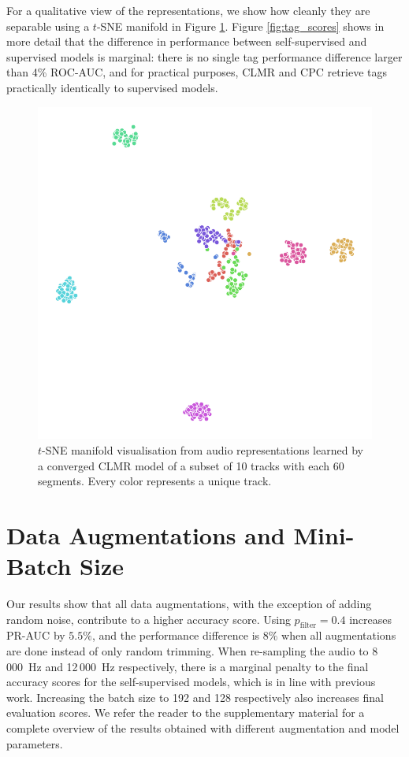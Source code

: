 For a qualitative view of the representations, we show how cleanly they are  separable using a $t$-SNE manifold in Figure \ref{fig:tsne_manifold}. Figure \ref{fig:tag_scores} shows in more detail that the difference in performance between self-supervised and supervised models is marginal: there is no single tag performance difference larger than 4\% ROC-AUC, and for practical purposes, CLMR and CPC retrieve tags practically identically to supervised models.

\begin{figure}[t]
    \centering
    \includegraphics[width=0.75\columnwidth]{figs/tsne-clmr.png}
    \caption{$t$-SNE manifold visualisation from audio representations learned by a converged CLMR model of a subset of 10 tracks with each 60 segments. Every color represents a unique track.}
    \label{fig:tsne_manifold}
\end{figure}



\section{Data Augmentations and Mini-Batch Size}
Our results show that all data augmentations, with the exception of adding random noise, contribute to a higher accuracy score. Using $p_{\mathrm{filter}}=0.4$ increases PR-AUC by $5.5\%$, and the performance difference is $8\%$ when all augmentations are done instead of only random trimming. When re-sampling the audio to 8\,000~Hz and 12\,000~Hz respectively, there is a marginal penalty to the final accuracy scores for the self-supervised models, which is in line with previous work\cite{lee2018samplecnn}. Increasing the batch size to 192 and 128 respectively also increases final evaluation scores. We refer the reader to the supplementary material for a complete overview of the results obtained with different augmentation and model parameters.


